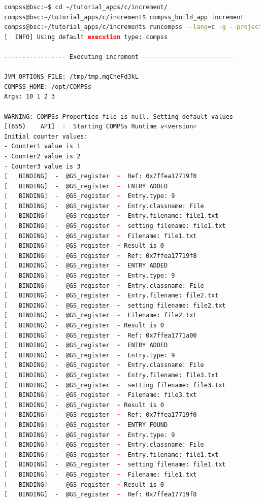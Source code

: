 \begin{lstlisting}[language=bash]
compss@bsc:~$ cd ~/tutorial_apps/c/increment/
compss@bsc:~/tutorial_apps/c/increment$ compss_build_app increment
compss@bsc:~/tutorial_apps/c/increment$ runcompss --lang=c -g --project=./xml/project.xml --resources=./xml/resources.xml ~/tutorial_apps/c/increment/master/increment 10 1 2 3
[  INFO] Using default execution type: compss

----------------- Executing increment --------------------------

JVM_OPTIONS_FILE: /tmp/tmp.mgCheFd3kL
COMPSS_HOME: /opt/COMPSs
Args: 10 1 2 3
 
WARNING: COMPSs Properties file is null. Setting default values
[(655)    API]  -  Starting COMPSs Runtime v<version>
Initial counter values: 
- Counter1 value is 1
- Counter2 value is 2
- Counter3 value is 3
[   BINDING]  -  @GS_register  -  Ref: 0x7ffea17719f0
[   BINDING]  -  @GS_register  -  ENTRY ADDED
[   BINDING]  -  @GS_register  -  Entry.type: 9
[   BINDING]  -  @GS_register  -  Entry.classname: File
[   BINDING]  -  @GS_register  -  Entry.filename: file1.txt
[   BINDING]  -  @GS_register  -  setting filename: file1.txt
[   BINDING]  -  @GS_register  -  Filename: file1.txt
[   BINDING]  -  @GS_register  - Result is 0
[   BINDING]  -  @GS_register  -  Ref: 0x7ffea17719f8
[   BINDING]  -  @GS_register  -  ENTRY ADDED
[   BINDING]  -  @GS_register  -  Entry.type: 9
[   BINDING]  -  @GS_register  -  Entry.classname: File
[   BINDING]  -  @GS_register  -  Entry.filename: file2.txt
[   BINDING]  -  @GS_register  -  setting filename: file2.txt
[   BINDING]  -  @GS_register  -  Filename: file2.txt
[   BINDING]  -  @GS_register  - Result is 0
[   BINDING]  -  @GS_register  -  Ref: 0x7ffea1771a00
[   BINDING]  -  @GS_register  -  ENTRY ADDED
[   BINDING]  -  @GS_register  -  Entry.type: 9
[   BINDING]  -  @GS_register  -  Entry.classname: File
[   BINDING]  -  @GS_register  -  Entry.filename: file3.txt
[   BINDING]  -  @GS_register  -  setting filename: file3.txt
[   BINDING]  -  @GS_register  -  Filename: file3.txt
[   BINDING]  -  @GS_register  - Result is 0
[   BINDING]  -  @GS_register  -  Ref: 0x7ffea17719f0
[   BINDING]  -  @GS_register  -  ENTRY FOUND
[   BINDING]  -  @GS_register  -  Entry.type: 9
[   BINDING]  -  @GS_register  -  Entry.classname: File
[   BINDING]  -  @GS_register  -  Entry.filename: file1.txt
[   BINDING]  -  @GS_register  -  setting filename: file1.txt
[   BINDING]  -  @GS_register  -  Filename: file1.txt
[   BINDING]  -  @GS_register  - Result is 0
[   BINDING]  -  @GS_register  -  Ref: 0x7ffea17719f8

\end{lstlisting}
